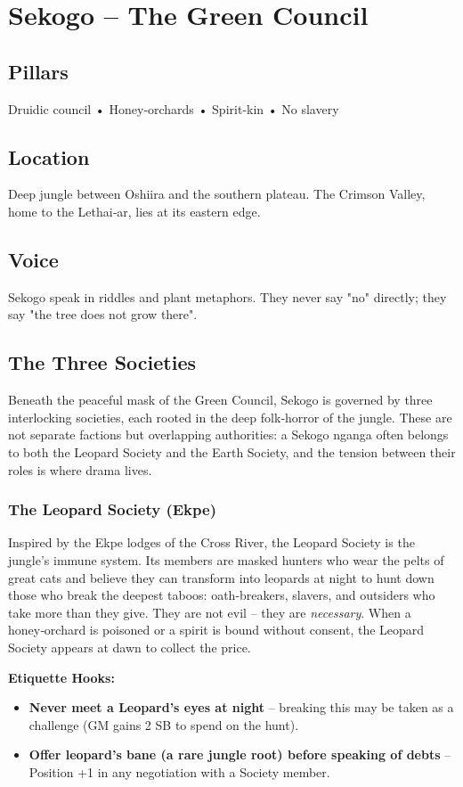 \documentclass[11pt]{book}
\begin{document}
\section{Sekogo -- The Green Council}

\subsection*{Pillars}
Druidic council • Honey‑orchards • Spirit‑kin • No slavery

\subsection*{Location}
Deep jungle between Oshiira and the southern plateau. The Crimson Valley, home to the Lethai‑ar, lies at its eastern edge.

\subsection*{Voice}
Sekogo speak in riddles and plant metaphors. They never say "no" directly; they say "the tree does not grow there".

\subsection*{The Three Societies}
Beneath the peaceful mask of the Green Council, Sekogo is governed by three interlocking societies, each rooted in the deep folk‑horror of the jungle. These are not separate factions but overlapping authorities: a Sekogo nganga often belongs to both the Leopard Society and the Earth Society, and the tension between their roles is where drama lives.

\subsubsection*{The Leopard Society (Ekpe)}
Inspired by the Ekpe lodges of the Cross River, the Leopard Society is the jungle's immune system. Its members are masked hunters who wear the pelts of great cats and believe they can transform into leopards at night to hunt down those who break the deepest taboos: oath‑breakers, slavers, and outsiders who take more than they give. They are not evil -- they are \textit{necessary}. When a honey‑orchard is poisoned or a spirit is bound without consent, the Leopard Society appears at dawn to collect the price.

\textbf{Etiquette Hooks:}
\begin{itemize}
\item \textbf{Never meet a Leopard's eyes at night} -- breaking this may be taken as a challenge (GM gains 2 SB to spend on the hunt).
\item \textbf{Offer leopard's bane (a rare jungle root) before speaking of debts} -- Position +1 in any negotiation with a Society member.
\end{itemize}
\end{document}
